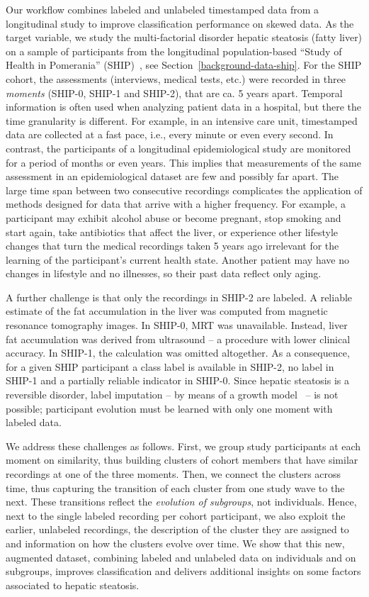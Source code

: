 \documentclass[
  oneside]{book}
\begin{document}
Our workflow combines labeled and unlabeled timestamped data from a longitudinal study to improve classification performance on skewed data.
As the target variable, we study the multi-factorial disorder hepatic steatosis (fatty liver) on a sample of participants from the longitudinal population-based ``Study of Health in Pomerania'' (SHIP)~\autocite{Voelzke:SHIP11}, see Section~\ref{background-data-ship}.
For the SHIP cohort, the assessments (interviews, medical tests, etc.) were recorded in three \emph{moments} (SHIP-0, SHIP-1 and SHIP-2), that are ca. 5 years apart.
Temporal information is often used when analyzing patient data in a hospital, but there the time granularity is different.
For example, in an intensive care unit, timestamped data are collected at a fast pace, i.e., every minute or even every second.
In contrast, the participants of a longitudinal epidemiological study are monitored for a period of months or even years.
This implies that measurements of the same assessment in an epidemiological dataset are few and possibly far apart.
The large time span between two consecutive recordings complicates the application of methods designed for data that arrive with a higher frequency.
For example, a participant may exhibit alcohol abuse or become pregnant, stop smoking and start again, take antibiotics that affect the liver, or experience other lifestyle changes that turn the medical recordings taken 5 years ago irrelevant for the learning of the participant's current health state.
Another patient may have no changes in lifestyle and no illnesses, so their past data reflect only aging.

A further challenge is that only the recordings in SHIP-2 are labeled.
A reliable estimate of the fat accumulation in the liver was computed from magnetic resonance tomography images.
In SHIP-0, MRT was unavailable.
Instead, liver fat accumulation was derived from ultrasound -- a procedure with lower clinical accuracy.
In SHIP-1, the calculation was omitted altogether.
As a consequence, for a given SHIP participant a class label is available in SHIP-2, no label in SHIP-1 and a partially reliable indicator in SHIP-0.
Since hepatic steatosis is a reversible disorder, label imputation -- by means of a growth model~\autocite{SingerWillelt03} -- is not possible; participant evolution must be learned with only one moment with labeled data.

We address these challenges as follows.
First, we group study participants at each moment on similarity, thus building clusters of cohort members that have similar recordings at one of the three moments.
Then, we connect the clusters across time, thus capturing the transition of each cluster from one study wave to the next.
These transitions reflect the \emph{evolution of subgroups}, not individuals.
Hence, next to the single labeled recording per cohort participant, we also exploit the earlier, unlabeled recordings, the description of the cluster they are assigned to and information on how the clusters evolve over time.
We show that this new, augmented dataset, combining labeled and unlabeled data on individuals and on subgroups, improves classification and delivers additional insights on some factors associated to hepatic steatosis.
\end{document}
